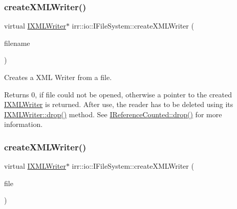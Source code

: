 \subsubsection{\texorpdfstring{create\+X\+M\+L\+Writer()}{createXMLWriter()}\hspace{0.1cm}{\footnotesize\ttfamily [2/4]}}
{\footnotesize\ttfamily virtual \hyperlink{classirr_1_1io_1_1IXMLWriter}{I\+X\+M\+L\+Writer}$\ast$ irr\+::io\+::\+I\+File\+System\+::create\+X\+M\+L\+Writer (\begin{DoxyParamCaption}\item[{const \hyperlink{namespaceirr_1_1io_a6468281622ce3a1c46b72e19f32dded5}{path} \&}]{filename }\end{DoxyParamCaption})\hspace{0.3cm}{\ttfamily [pure virtual]}}



Creates a X\+ML Writer from a file. 

\begin{DoxyReturn}{Returns}
0, if file could not be opened, otherwise a pointer to the created \hyperlink{classirr_1_1io_1_1IXMLWriter}{I\+X\+M\+L\+Writer} is returned. After use, the reader has to be deleted using its \hyperlink{classirr_1_1IReferenceCounted_a03856a09355b89d178090c4a5f738543}{I\+X\+M\+L\+Writer\+::drop()} method. See \hyperlink{classirr_1_1IReferenceCounted_a03856a09355b89d178090c4a5f738543}{I\+Reference\+Counted\+::drop()} for more information. 
\end{DoxyReturn}
\mbox{\label{classirr_1_1io_1_1IFileSystem_ac2bcaf8c338e80ff579061b7056c06da}} 
\subsubsection{\texorpdfstring{create\+X\+M\+L\+Writer()}{createXMLWriter()}\hspace{0.1cm}{\footnotesize\ttfamily [3/4]}}
{\footnotesize\ttfamily virtual \hyperlink{classirr_1_1io_1_1IXMLWriter}{I\+X\+M\+L\+Writer}$\ast$ irr\+::io\+::\+I\+File\+System\+::create\+X\+M\+L\+Writer (\begin{DoxyParamCaption}\item[{\hyperlink{classirr_1_1io_1_1IWriteFile}{I\+Write\+File} $\ast$}]{file }\end{DoxyParamCaption})\hspace{0.3cm}{\ttfamily [pure virtual]}}




